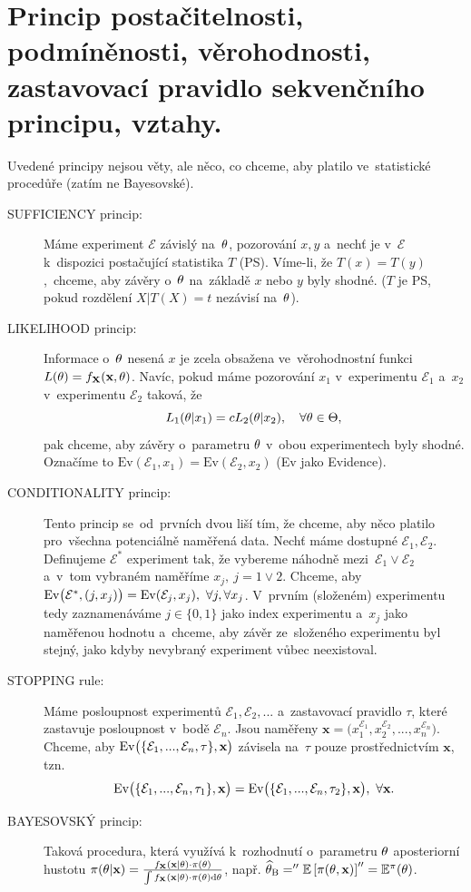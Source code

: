 \chapter{Princip postačitelnosti, podmíněnosti, věrohodnosti, zastavovací pravidlo sekvenčního principu, vztahy.}
Uvedené principy nejsou věty, ale něco, co chceme, aby platilo ve~statistické procedůře (zatím ne Bayesovské).
\begin{description}
	\item[SUFFICIENCY princip:] Máme experiment $\mathcal{E}$ závislý na~$\theta$, pozorování $x,y$ a~nechť je v~$\mathcal{E}$ k~dispozici postačující statistika $T$ (PS). Víme-li, že $T(x)=T(y)$,~chceme, aby závěry o~$\theta$ na~základě $x$ nebo $y$ byly shodné. ($T$ je PS, pokud rozdělení $X|T(X)=t$ nezávisí na~$\theta$).
	
	\item[LIKELIHOOD princip:] Informace o~$\theta$ nesená $x$ je zcela obsažena ve~věrohodnostní funkci $L(\theta)=f_{\textbf{X}}(\textbf{x},\theta)$. Navíc, pokud máme pozorování $x_1$ v~experimentu $\mathcal{E}_1$ a~$x_2$ v~experimentu $\mathcal{E}_2$ taková, že 
	$$ L_1(\theta|x_1)=c L_2(\theta|x_2),\quad\forall\theta\in\Theta,$$
	pak chceme, aby závěry o~parametru $\theta$ v~obou experimentech byly shodné. Označíme to $\mathrm{Ev}(\mathcal{E}_1,x_1)=\mathrm{Ev}(\mathcal{E}_2,x_2)$ (Ev jako Evidence). 
	
	\item[CONDITIONALITY princip:] Tento princip se~od~prvních dvou liší tím, že chceme, aby něco platilo pro~všechna potenciálně naměřená data. Nechť máme dostupné $\mathcal{E}_1,\mathcal{E}_2$. Definujeme $\mathcal{E}^*$ experiment tak, že vybereme náhodně mezi~$\mathcal{E}_1 \vee \mathcal{E}_2$ a~v~tom vybraném naměříme $x_j,~j=1\vee 2$. Chceme, aby $\mathrm{Ev}\big(\mathcal{E}^*,(j,x_j)\big)=\mathrm{Ev}(\mathcal{E}_j,x_j),~\forall j,\forall x_j$. V~prvním (složeném) experimentu tedy zaznamenáváme $j\in\{0,1\}$ jako index experimentu a~$x_j$ jako naměřenou hodnotu a~chceme, aby závěr ze~složeného experimentu byl stejný, jako kdyby nevybraný experiment vůbec neexistoval.
	\item[STOPPING rule:] Máme posloupnost experimentů $\mathcal{E}_1,\mathcal{E}_2,...$ a~zastavovací pravidlo $\tau$, které zastavuje posloupnost v~bodě $\mathcal{E}_n$. Jsou naměřeny $\textbf{x}=\big( x_1^{\mathcal{E}_1},x_2^{\mathcal{E}_2},...,x_n^{\mathcal{E}_n} \big)$. Chceme, aby $\mathrm{Ev}\big( \{ \mathcal{E}_1,...,\mathcal{E}_n,\tau \},\textbf{x} \big)$ závisela na~$\tau$ pouze prostřednictvím $\textbf{x}$, tzn. $$\mathrm{Ev}\big( \{ \mathcal{E}_1,...,\mathcal{E}_n,\tau_1 \},\textbf{x} \big)=\mathrm{Ev}\big( \{ \mathcal{E}_1,...,\mathcal{E}_n,\tau_2 \},\textbf{x} \big),~\forall \textbf{x}.$$
	\item[BAYESOVSKÝ princip:] Taková procedura, která využívá k~rozhodnutí o~parametru $\theta$ aposteriorní hustotu $\pi(\theta|\textbf{x})=\frac{f_{\textbf{X}}(\textbf{x}|\theta)\cdot\pi(\theta)}{\int f_{\textbf{X}}(\textbf{x}|\theta)\cdot\pi(\theta) \mathrm{d}\theta}$, např. $\widehat{\theta}_\mathrm{B}=''\mathbb{E}\left[ \pi(\theta,\textbf{x}) \right]''=\mathbb{E}^\pi(\theta)$.
\end{description}

